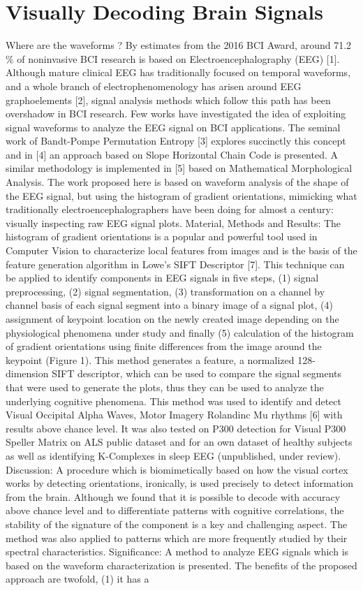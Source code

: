 \chapter{Visually Decoding Brain Signals}

Where are the waveforms ? By estimates from the 2016 BCI Award, around 71.2$\%$ of noninvasive BCI research is based on Electroencephalography (EEG) [1]. Although mature clinical EEG has traditionally focused on temporal waveforms, and a whole branch of electrophenomenology has arisen around EEG graphoelements [2], signal analysis methods which follow this path has been overshadow in BCI research. Few works have investigated the idea of exploiting signal waveforms to analyze the EEG signal on BCI applications. The seminal work of Bandt-Pompe Permutation Entropy [3] explores succinctly this concept and in [4] an approach based on Slope Horizontal Chain Code is presented. A similar methodology is implemented in [5] based on Mathematical Morphological Analysis. The work proposed here is based on waveform analysis of the shape of the EEG signal, but using the histogram of gradient orientations, mimicking what traditionally electroencephalographers have been doing for almost a century: visually inspecting raw EEG signal plots. Material, Methods and Results: The histogram of gradient orientations is a popular and powerful tool used in Computer Vision to characterize local features from images and is the basis of the feature generation algorithm in Lowe's SIFT Descriptor [7]. This technique can be applied to identify components in EEG signals in five steps, (1) signal preprocessing, (2) signal segmentation, (3) transformation on a channel by channel basis of each signal segment into a binary image of a signal plot, (4) assignment of keypoint location on the newly created image depending on the physiological phenomena under study and finally (5) calculation of the histogram of gradient orientations using finite differences from the image around the keypoint (Figure 1). This method generates a feature, a normalized 128-dimension SIFT descriptor, which can be used to compare the signal segments that were used to generate the plots, thus they can be used to analyze the underlying cognitive phenomena. This method was used to identify and detect Visual Occipital Alpha Waves, Motor Imagery Rolandinc Mu rhythms [6] with results above chance level. It was also tested on P300 detection for Visual P300 Speller Matrix on ALS public dataset and for an own dataset of healthy subjects as well as identifying K-Complexes in sleep EEG (unpublished, under review). Discussion: A procedure which is biomimetically based on how the visual cortex works by detecting orientations, ironically, is used precisely to detect information from the brain. Although we found that it is possible to decode with accuracy above chance level and to differentiate patterns with cognitive correlations, the stability of the signature of the component is a key and challenging aspect. The method was also applied to patterns which are more frequently studied by their spectral characteristics. Significance: A method to analyze EEG signals which is based on the waveform characterization is presented. The benefits of the proposed approach are twofold, (1) it has a 